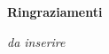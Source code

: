 \thispagestyle{empty}

\begin{center}
  {\bf \Huge Ringraziamenti}
\end{center}

\vspace{4cm}


\emph{
    da inserire
}
